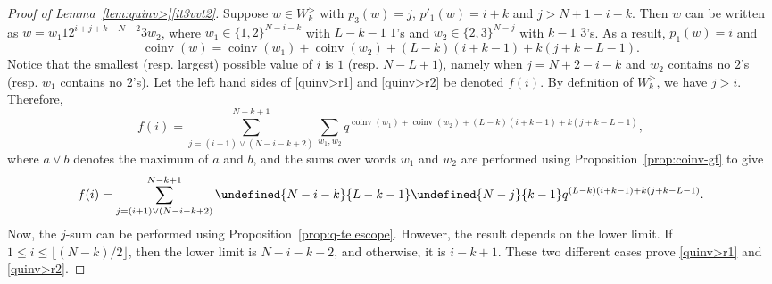 \documentclass[11pt]{article}
\theoremstyle{definition}
\providecommand{\qbinom}[2]{\genfrac{[}{]}{0pt}{}{#1}{#2}}
\numberwithin{equation}{section}
\DeclareMathOperator{\coinv}{coinv}
\let\qbinom\undefined
\newcommand{\qbinom}[2]{\bgroup\renewcommand*{\arraystretch}{1}\begin{bmatrix} #1 \\ #2\end{bmatrix} \egroup}
\begin{document}
\begin{proof}[Proof of Lemma~\ref{lem:quinv>}\ref{it3vvt2}]
Suppose $w \in  W_k^>$ with $p_3(w) = j$, $p'_1(w) = i+k$ and $j > N+1 - i-k$. Then
$w$ can be written as $w = w_1 1 2^{i+j+k-N-2} 3 w_2$, where $w_1 \in \{1,2\}^{N-i-k}$ with $L-k-1$ $1$'s
and $w_2 \in \{2,3\}^{N-j}$ with $k-1$ $3$'s. As a result, $p_1(w) = i$ and
\[
\coinv(w) = \coinv(w_1) + \coinv(w_2) + (L-k)(i+k-1) + k(j+k-L-1).
\]
Notice that the smallest (resp. largest) possible value of $i$ is $1$ (resp. $N-L+1$), namely when 
$j = N+2-i-k$ and $w_2$ contains no $2$'s
(resp. $w_1$ contains no $2$'s).
Let the left hand sides of \eqref{quinv>r1} and \eqref{quinv>r2} be denoted $f(i)$.
By definition of $W_k^>$, we have $j > i$. Therefore,
\[
f(i) = \sum_{j=(i+1) \vee (N-i-k+2)}^{N-k+1} \sum_{w_1,w_2} q^{\coinv(w_1) + \coinv(w_2) + (L-k)(i+k-1) + k(j+k-L-1)},
\]
where $a \vee b$ denotes the maximum of $a$ and $b$,
and the sums over words $w_1$ and $w_2$ are performed using Proposition~\ref{prop:coinv-gf} to give
\[
f(i) = \sum_{j=(i+1) \vee (N-i-k+2)}^{N-k+1} \qbinom {N-i-k}{L-k-1} \qbinom{N-j}{k-1} q^{ (L-k)(i+k-1) + k(j+k-L-1)}.
\]
Now, the $j$-sum can be performed using Proposition~\ref{prop:q-telescope}. However, the result depends on 
the lower limit. If $1 \leq i \leq \lfloor (N-k)/2 \rfloor$, then the lower limit is $N-i-k+2$, and otherwise,
it is $i-k+1$. These two different cases prove \eqref{quinv>r1} and \eqref{quinv>r2}.
\end{proof}
\end{document}
